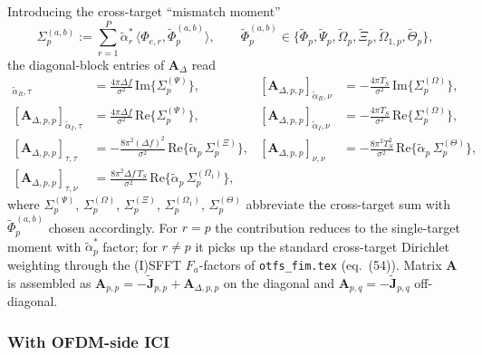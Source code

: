 \documentclass[11pt]{article}
\begin{document}
Introducing the cross-target ``mismatch moment''
\begin{equation}
    \Sigma_p^{(a,b)} := \sum_{r=1}^{P} \tilde{\alpha}_r^*\, \langle \Phi_{e,r}, \tilde{\Phi}_p^{(a,b)}\rangle, \qquad \tilde{\Phi}_p^{(a,b)} \in \{\tilde{\Phi}_p, \tilde{\Psi}_p, \tilde{\Omega}_p, \tilde{\Xi}_p, \tilde{\Omega}_{1,p}, \tilde{\Theta}_p\},
\end{equation}
the diagonal-block entries of \(\bm{A}_\Delta\) read
\begin{align}
    [\bm{A}_{\Delta, p,p}]_{\tilde{\alpha}_R, \tau} &= \tfrac{4\pi\Delta f}{\sigma^2}\, \mathrm{Im}\{\Sigma_p^{(\Psi)}\}, &
    [\bm{A}_{\Delta, p,p}]_{\tilde{\alpha}_R, \nu} &= -\tfrac{4\pi T_S}{\sigma^2}\, \mathrm{Im}\{\Sigma_p^{(\Omega)}\}, \\
    [\bm{A}_{\Delta, p,p}]_{\tilde{\alpha}_I, \tau} &= \tfrac{4\pi\Delta f}{\sigma^2}\, \mathrm{Re}\{\Sigma_p^{(\Psi)}\}, &
    [\bm{A}_{\Delta, p,p}]_{\tilde{\alpha}_I, \nu} &= -\tfrac{4\pi T_S}{\sigma^2}\, \mathrm{Re}\{\Sigma_p^{(\Omega)}\}, \\
    [\bm{A}_{\Delta, p,p}]_{\tau, \tau} &= -\tfrac{8\pi^2 (\Delta f)^2}{\sigma^2}\, \mathrm{Re}\{\tilde{\alpha}_p\, \Sigma_p^{(\Xi)}\}, &
    [\bm{A}_{\Delta, p,p}]_{\nu, \nu} &= -\tfrac{8\pi^2 T_S^2}{\sigma^2}\, \mathrm{Re}\{\tilde{\alpha}_p\, \Sigma_p^{(\Theta)}\}, \\
    [\bm{A}_{\Delta, p,p}]_{\tau, \nu} &= \tfrac{8\pi^2 \Delta f\, T_S}{\sigma^2}\, \mathrm{Re}\{\tilde{\alpha}_p\, \Sigma_p^{(\Omega_1)}\}, & &
\end{align}
where \(\Sigma_p^{(\Psi)}\), \(\Sigma_p^{(\Omega)}\), \(\Sigma_p^{(\Xi)}\), \(\Sigma_p^{(\Omega_1)}\), \(\Sigma_p^{(\Theta)}\) abbreviate the cross-target sum with \(\tilde{\Phi}_p^{(a,b)}\) chosen accordingly. For \(r = p\) the contribution reduces to the single-target moment with \(\tilde{\alpha}_p^*\) factor; for \(r \neq p\) it picks up the standard cross-target Dirichlet weighting through the (I)SFFT \(F_a\)-factors of \texttt{otfs\_fim.tex} (eq.~(54)). Matrix \(\bm{A}\) is assembled as \(\bm{A}_{p,p} = -\tilde{\bm{J}}_{p,p} + \bm{A}_{\Delta, p,p}\) on the diagonal and \(\bm{A}_{p,q} = -\tilde{\bm{J}}_{p,q}\) off-diagonal.

\subsubsection{With OFDM-side ICI}
\end{document}
